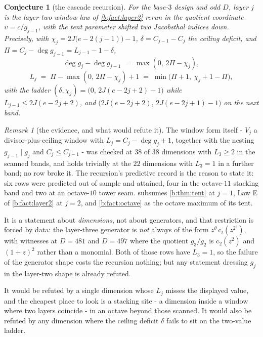 \documentclass[11pt]{amsart}
\newtheorem{conjecture}[theorem]{Conjecture}
\theoremstyle{definition}
\theoremstyle{remark}
\newtheorem{remark}[theorem]{Remark}
\begin{document}
\begin{conjecture}[the cascade recursion]
\label{b:con:cascade}
For the base-$3$ design and odd $D$, layer $j$ is the layer-two window law of \cref{b:fact:layer2} rerun in the quotient coordinate $\upsilon = c/g_{j-1}$, with the tent parameter shifted two Jacobsthal indices down. Precisely, with $\chi_j = 2J\bigl(e - 2(j-1)\bigr) - 1$, $\delta = C_{j-1} - C_j$ the ceiling deficit, and $\Pi = C_j - \deg g_{j-1} = L_{j-1} - 1 - \delta$,
\[
  \deg g_j - \deg g_{j-1} \;=\; \max(0,\, 2\Pi - \chi_j),
\]
\[
  L_j \;=\; \Pi - \max(0,\, 2\Pi - \chi_j) + 1 \;=\; \min\bigl(\Pi+1,\ \chi_j + 1 - \Pi\bigr),
\]
with the ladder $(\delta, \chi_j) = \bigl(0,\, 2J(e-2j+2)-1\bigr)$ while $L_{j-1} \le 2J(e-2j+2)$, and $\bigl(2J(e-2j+2),\, 2J(e-2j+1)-1\bigr)$ on the next band.
\end{conjecture}

\begin{remark}[the evidence, and what would refute it]
\label{b:rem:cascade}
The window form itself - $V_j$ a divisor-plus-ceiling window with $L_j = C_j - \deg g_j + 1$, together with the nesting $g_{j-1} \mid g_j$ and $C_j \le C_{j-1}$ - was checked at $38$ of $38$ dimensions with $L_3 \ge 2$ in the scanned bands, and holds trivially at the $22$ dimensions with $L_3 = 1$ in a further band; no row broke it. The recursion's predictive record is the reason to state it: six rows were predicted out of sample and attained, four in the octave-$11$ stacking band and two at an octave-$10$ tower seam.  subsumes \cref{b:thm:tent} at $j = 1$, Law E of \cref{b:fact:layer2} at $j = 2$, and \cref{b:fact:octave} as the octave maximum of its tent.

It is a statement about \emph{dimensions}, not about generators, and that restriction is forced by data: the layer-three generator is \emph{not} always of the form $z^{\theta}\,\mathrm{c}_t(z^{2^e})$, with witnesses at $D = 481$ and $D = 497$ where the quotient $g_3/g_2$ is $\mathrm{c}_2(z^2)$ and $(1+z)^2$ rather than a monomial. Both of those rows have $L_3 = 1$, so the failure of the generator shape costs the recursion nothing; but any statement dressing $g_j$ in the layer-two shape is already refuted.

It would be refuted by a single dimension whose $L_j$ misses the displayed value, and the cheapest place to look is a stacking site - a dimension inside a window where two layers coincide - in an octave beyond those scanned. It would also be refuted by any dimension where the ceiling deficit $\delta$ fails to sit on the two-value ladder.
\end{remark}
\end{document}
